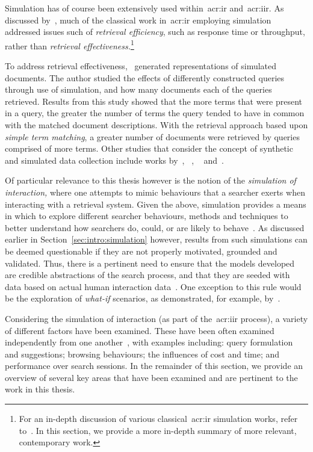 Simulation has of course been extensively used within~\gls{acr:ir} and~\gls{acr:iir}. As discussed by~\cite{gordon1990evaluating}, much of the classical work in~\gls{acr:ir} employing simulation addressed issues such of \emph{retrieval efficiency}, such as response time or throughput, rather than \emph{retrieval effectiveness.}\footnote{For an in-depth discussion of various classical~\gls{acr:ir} simulation works, refer to~\cite{heine1981simulation}. In this section, we provide a more in-depth summary of more relevant, contemporary work.}

To address retrieval effectiveness,~\cite{cooper1973simulation} generated representations of simulated documents. The author studied the effects of differently constructed queries through use of simulation, and how many documents each of the queries retrieved. Results from this study showed that the more terms that were present in a query, the greater the number of terms the query tended to have in common with the matched document descriptions. With the retrieval approach based upon \emph{simple term matching}, a greater number of documents were retrieved by queries comprised of more terms. Other studies that consider the concept of synthetic and simulated data collection include works by~\cite{tague1980simulation_bibliographic}, ~\cite{jordan2006cqg}, ~\cite{azzopardi2007languages} and~\cite{azzopardi2009query_side}.

Of particular relevance to this thesis however is the notion of the \emph{simulation of interaction,} where one attempts to mimic behaviours that a searcher exerts when interacting with a retrieval system. Given the above, simulation provides a means in which to explore different searcher behaviours, methods and techniques to better understand how searchers do, could, or are likely to behave~\citep{azzopardi2010workshop}. As discussed earlier in Section~\ref{sec:intro:simulation} however, results from such simulations can be deemed questionable if they are not properly motivated, grounded and validated. Thus, there is a pertinent need to ensure that the models developed are credible abstractions of the search process, and that they are seeded with data based on actual human interaction data~\citep{azzopardi2010workshop}. One exception to this rule would be the exploration of \emph{what-if} scenarios, as demonstrated, for example, by~\cite{azzopardi2011economics}.

Considering the simulation of interaction (as part of the~\gls{acr:iir} process), a variety of different factors have been examined. These have been often examined independently from one another~\citep{azzopardi2010workshop}, with examples including: query formulation and suggestions; browsing behaviours; the influences of cost and time; and performance over search sessions. In the remainder of this section, we provide an overview of several key areas that have been examined and are pertinent to the work in this thesis.

